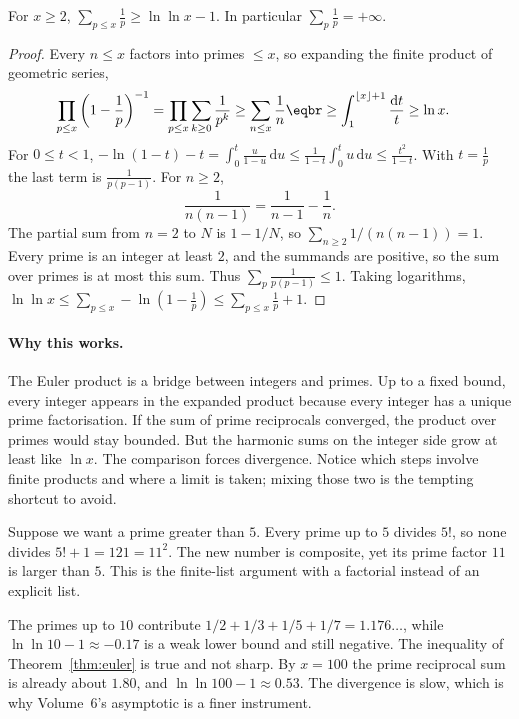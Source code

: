 \begin{theorem}[Euler]\label{thm:euler}
For $x\ge2$, $\displaystyle\sum_{p\le x}\frac1p\ge\ln\ln x-1$. In particular $\sum_p\frac1p=+\infty$.
\end{theorem}
\begin{proof}
Every $n\le x$ factors into primes $\le x$, so expanding the finite product of geometric series,
\[
\begin{aligned}\prod_{p\le x}\left(1-\frac1p\right)^{-1}&=\prod_{p\le x}\sum_{k\ge0}\frac1{p^k}\ge\sum_{n\le x}\frac1n\eqbr\ge\int_1^{\lfloor x\rfloor+1}\frac{\mathrm dt}t\ge\ln x.\end{aligned}
\]
For $0\le t<1$, $-\ln(1-t)-t=\int_0^t\frac u{1-u}\,\mathrm du\le\frac1{1-t}\int_0^t u\,\mathrm du\le\frac{t^2}{1-t}$. With $t=\frac1p$ the last term is $\frac1{p(p-1)}$. For $n\ge2$,
\[
\frac1{n(n-1)}=\frac1{n-1}-\frac1n.
\]
The partial sum from $n=2$ to $N$ is $1-1/N$, so $\sum_{n\ge2}1/(n(n-1))=1$. Every prime is an integer at least $2$, and the summands are positive, so the sum over primes is at most this sum. Thus $\sum_p\frac1{p(p-1)}\le1$. Taking logarithms,
$\ln\ln x\le\sum_{p\le x}-\ln\left(1-\frac1p\right)\le\sum_{p\le x}\frac1p+1$.
\end{proof}

\paragraph{Why this works.}
The Euler product is a bridge between integers and primes. Up to a fixed bound, every integer appears in the expanded product because every integer has a unique prime factorisation. If the sum of prime reciprocals converged, the product over primes would stay bounded. But the harmonic sums on the integer side grow at least like $\ln x$. The comparison forces divergence. Notice which steps involve finite products and where a limit is taken; mixing those two is the tempting shortcut to avoid.

\begin{examplex}
Suppose we want a prime greater than $5$. Every prime up to $5$ divides $5!$, so none divides $5!+1=121=11^2$. The new number is composite, yet its prime factor $11$ is larger than $5$. This is the finite-list argument with a factorial instead of an explicit list.
\end{examplex}

\begin{examplex}
The primes up to $10$ contribute $1/2+1/3+1/5+1/7=1.176\ldots$, while $\ln\ln 10-1\approx -0.17$ is a weak lower bound and still negative. The inequality of Theorem~\ref{thm:euler} is true and not sharp. By $x=100$ the prime reciprocal sum is already about $1.80$, and $\ln\ln 100-1\approx 0.53$. The divergence is slow, which is why Volume~6's asymptotic is a finer instrument.
\end{examplex}

